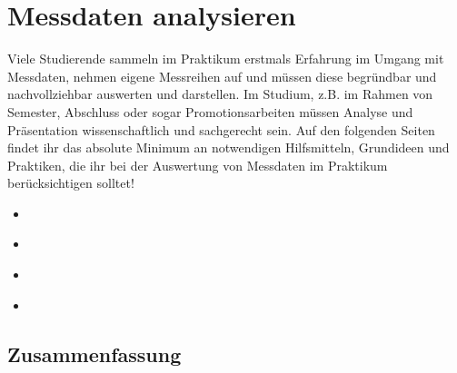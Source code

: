 \documentclass[letterpaper,10pt,english]{jupyterBook}
\begin{document}
\chapter{Messdaten analysieren}
\label{\detokenize{content/1_Datenanalyse:messdaten-analysieren}}\label{\detokenize{content/1_Datenanalyse::doc}}
\sphinxAtStartPar
Viele Studierende sammeln im Praktikum erstmals Erfahrung im Umgang mit Messdaten, nehmen eigene Messreihen auf und müssen diese begründbar und nachvollziehbar auswerten und darstellen. Im Studium, z.B. im Rahmen von Semester\sphinxhyphen{}, Abschluss\sphinxhyphen{} oder sogar Promotionsarbeiten müssen Analyse und Präsentation wissenschaftlich und sachgerecht sein. Auf den folgenden Seiten findet ihr das absolute Minimum an notwendigen Hilfsmitteln, Grundideen und Praktiken, die ihr bei der Auswertung von Messdaten im Praktikum berücksichtigen solltet!
\begin{itemize}
\item {} 
\sphinxAtStartPar
{\hyperref[\detokenize{content/1_Messunsicherheiten::doc}]{}}

\item {} 
\sphinxAtStartPar
{\hyperref[\detokenize{content/1_Mittelwert_StdAbw::doc}]{}}

\item {} 
\sphinxAtStartPar
{\hyperref[\detokenize{content/1_Fehlerfortpflanzung::doc}]{}}

\item {} 
\sphinxAtStartPar
{\hyperref[\detokenize{content/1_Kurvenanpassung::doc}]{}}

\end{itemize}


\section{Zusammenfassung}
\label{\detokenize{content/1_Datenanalyse:zusammenfassung}}
\end{document}

